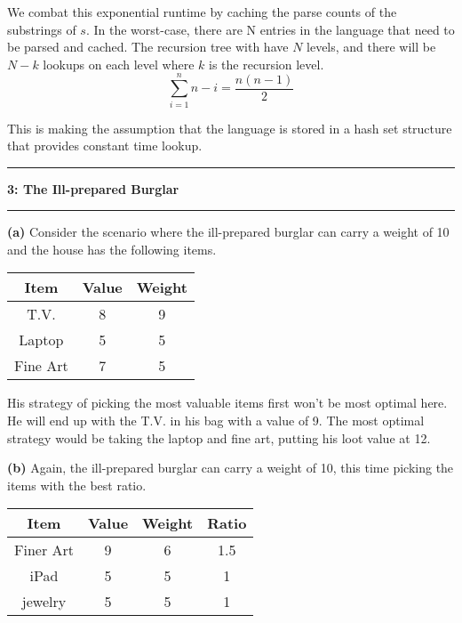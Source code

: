 \documentclass[11pt]{article}
\newcommand\question[2]{\vspace{.25in}\hrule\textbf{#1: #2}\vspace{.5em}\hrule\vspace{.10in}}
\renewcommand\part[1]{\vspace{.10in}\textbf{(#1)}}
\begin{document}
 We combat this exponential runtime by caching the parse counts of the substrings of $s$. In the worst-case, there are N entries in the language that need to be parsed and cached. The recursion tree with have $N$ levels, and there will be $N-k$ lookups on each level where $k$ is the recursion level. 
 $$\sum_{i=1}^{n} n-i = \frac{n(n-1)}{2}$$
 
 This is making the assumption that the language is stored in a hash set structure that provides constant time lookup.
 
 
\question{3}{The Ill-prepared Burglar}

\part{a} Consider the scenario where the ill-prepared burglar can carry a weight of 10 and the house has the following items.

\begin{table}[H]
\centering
{\renewcommand{\arraystretch}{1.2}%
\begin{tabular}{| c | c | c |}
\hline
Item& Value& Weight\\
\hline
T.V. & 8& 9\\ \hline
Laptop & 5& 5\\ \hline
Fine Art & 7& 5\\ \hline
\end{tabular}}
\end{table}

His strategy of picking the most valuable items first won't be most optimal here. He will end up with the T.V. in his bag with a value of 9. The most optimal strategy would be taking the laptop and fine art, putting his loot value at 12.

\part{b} Again, the ill-prepared burglar can carry a weight of 10, this time picking the items with the best ratio.

\begin{table}[H]
\centering
{\renewcommand{\arraystretch}{1.2}%
\begin{tabular}{| c | c | c | c |}
\hline
Item& Value& Weight& Ratio\\
\hline
Finer Art & 9& 6&1.5 \\ \hline
iPad & 5& 5&1\\ \hline
jewelry  & 5& 5&1\\ \hline
\end{tabular}}
\end{table}
\end{document}
